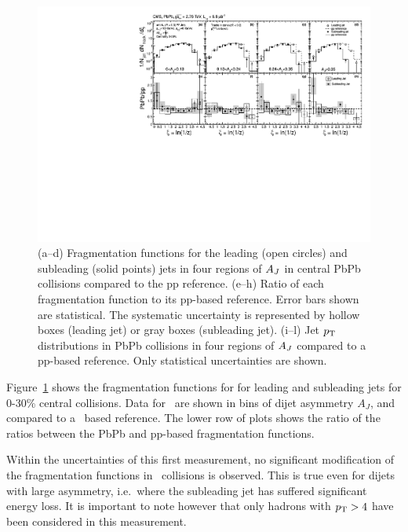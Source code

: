 \begin{figure}[!h]
\begin{center}
\includegraphics[width=0.98\mboxwidth]{jetfigures/xsi_div_both_effv9_l100s40_0to12_dphi20eta20dr3pt4id1_cwt_ppDiv_gray.pdf}
\caption{(a--d) Fragmentation functions for the leading (open circles) and subleading (solid points) jets in four regions of $A_J$ in central PbPb collisions compared to the pp reference.
(e--h) Ratio of each fragmentation function to its pp-based reference.
Error bars shown are statistical. The systematic uncertainty is
represented by hollow boxes (leading jet) or gray boxes (subleading jet).
(i--l) Jet $p_{\rm{T}}$ distributions in PbPb collisions in four regions of $A_J$ 
compared to a pp-based reference. Only statistical uncertainties are shown.
}

\label{fig:GR:CMS_jetFF}
\end{center}
\end{figure}
Figure~\ref{fig:GR:CMS_jetFF} shows the fragmentation functions for
for leading and subleading jets for 0-30\% central collisions. Data for \PbPb\ are shown in 
bins of dijet asymmetry $A_J$, and compared to a \pp\ based reference.
The lower row of plots shows the ratio of the ratios between the PbPb 
and pp-based fragmentation functions.

Within the uncertainties of this first measurement, no significant modification of 
the fragmentation functions in \PbPb\ collisions is observed. This is true even for 
dijets with large asymmetry, i.e.\ where the subleading jet has suffered significant
energy loss. It is important to note however that only hadrons with $\mbox{$p_{\mathrm{T}}$} > 4$\GeVc
have been considered in this measurement.

